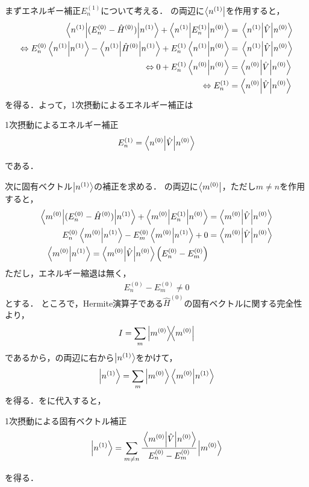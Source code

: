 \documentclass{report}
\begin{document}
  まずエネルギー補正$E_n^{(1)}$について考える．
  の両辺に$\bra{n^{(1)}}$を作用すると，
  \begin{align}
    \ev**{(E_n^{(0)} - \hat{H}^{(0)})}{n^{(1)}} + \mel**{n^{(1)}}{E_n^{(1)}}{n^{(0)}} &= \mel{n^{(1)}}{\hat{V}}{n^{(0)}} \\ 
    \Leftrightarrow E_n^{(0)}\braket{n^{(1)}} - \ev**{\hat{H}^{(0)}}{n^{(1)}} + E_n^{(1)}\braket{n^{(1)}}{n^{(0)}} &= \mel{n^{(1)}}{\hat{V}}{n^{(0)}} \\ 
    \Leftrightarrow 0 + E_n^{(1)}\braket{n^{(0)}} &= \ev**{\hat{V}}{n^{(0)}} \\ 
    \Leftrightarrow E_n^{(1)} &= \ev**{\hat{V}}{n^{(0)}}
  \end{align}
  を得る．よって，1次摂動によるエネルギー補正は
  \begin{itembox}[l]{1次摂動によるエネルギー補正}
    \begin{align}
      E_n^{(1)} = \ev**{\hat{V}}{n^{(0)}}
    \end{align}
  \end{itembox}
  である．
  \par
  次に固有ベクトル$\ket{n^{(1)}}$の補正を求める．
  の両辺に$\bra{m^{(0)}}$，ただし$m\neq n$を作用すると，
  \begin{align}
    \mel**{m^{(0)}}{(E_n^{(0)} - \hat{H}^{(0)})}{n^{(1)}} + \mel**{m^{(0)}}{E_n^{(1)}}{n^{(0)}} &= \mel**{m^{(0)}}{\hat{V}}{n^{(0)}} \\ 
    E_n^{(0)}\braket{m^{(0)}}{n^{(1)}} - E_m^{(0)}\braket{m^{(0)}}{n^{(1)}} + 0 &= \mel**{m^{(0)}}{\hat{V}}{n^{(0)}}\\
    \braket{m^{(0)}}{n^{(1)}} = \mel**{m^{(0)}}{\hat{V}}{n^{(0)}} \qty(E_n^{(0)} - E_m^{(0)}) \label{1st-perturbation-prep}\\
  \end{align}
  ただし，エネルギー縮退は無く，
  \begin{align}
    E_n^{(0)}-E_m^{(0)} \neq 0\label{no-degeneracy}
  \end{align}
  とする．
  ところで，Hermite演算子である$\hat{H}^{(0)}$の固有ベクトルに関する完全性より，
  \begin{align}
    I = \sum_{m}\ketbra{m^{(0)}}{m^{(0)}}\label{completeness}
  \end{align}
  であるから，の両辺に右から$\ket{n^{(1)}}$をかけて，
  \begin{align}
    \ket{n^{(1)}} = \sum_{m}\ket{m^{(0)}}\braket{m^{(0)}}{n^{(1)}}\label{n1-completeness-expantion}
  \end{align}
  を得る．をに代入すると，
  \begin{itembox}[l]{1次摂動による固有ベクトル補正}
    \begin{align}
      \ket{n^{(1)}} = \sum_{m\neq n}\cfrac{\mel**{m^{(0)}}{\hat{V}}{n^{(0)}}}{E_n^{(0)} - E_m^{(0)}}\ket{m^{(0)}}\label{1st-order-eigenvector}
    \end{align}
  \end{itembox}
  を得る．
\end{document}
